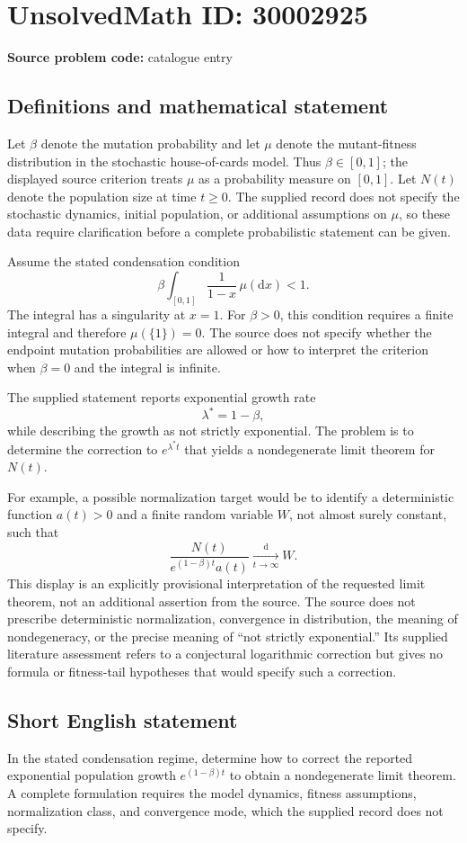 \documentclass[11pt]{article}
\begin{document}
\section*{UnsolvedMath ID: 30002925}
\textbf{Source problem code:} catalogue entry
\subsection{Definitions and mathematical statement}
Let \(\beta\) denote the mutation probability and let \(\mu\) denote the mutant-fitness distribution in the stochastic house-of-cards model. Thus \(\beta\in[0,1]\); the displayed source criterion treats \(\mu\) as a probability measure on \([0,1]\). Let \(N(t)\) denote the population size at time \(t\geq0\). The supplied record does not specify the stochastic dynamics, initial population, or additional assumptions on \(\mu\), so these data require clarification before a complete probabilistic statement can be given.

Assume the stated condensation condition
\[
\beta\int_{[0,1]}\frac{1}{1-x}\,\mu(\mathrm{d}x)<1.
\]
The integral has a singularity at \(x=1\). For \(\beta>0\), this condition requires a finite integral and therefore \(\mu(\{1\})=0\). The source does not specify whether the endpoint mutation probabilities are allowed or how to interpret the criterion when \(\beta=0\) and the integral is infinite.

The supplied statement reports exponential growth rate
\[
\lambda^*=1-\beta,
\]
while describing the growth as not strictly exponential. The problem is to determine the correction to \(e^{\lambda^*t}\) that yields a nondegenerate limit theorem for \(N(t)\).

For example, a possible normalization target would be to identify a deterministic function \(a(t)>0\) and a finite random variable \(W\), not almost surely constant, such that
\[
\frac{N(t)}{e^{(1-\beta)t}a(t)}
\xrightarrow[t\to\infty]{\mathrm{d}} W.
\]
This display is an explicitly provisional interpretation of the requested limit theorem, not an additional assertion from the source. The source does not prescribe deterministic normalization, convergence in distribution, the meaning of nondegeneracy, or the precise meaning of ``not strictly exponential.'' Its supplied literature assessment refers to a conjectural logarithmic correction but gives no formula or fitness-tail hypotheses that would specify such a correction.
\subsection{Short English statement}
In the stated condensation regime, determine how to correct the reported exponential population growth \(e^{(1-\beta)t}\) to obtain a nondegenerate limit theorem. A complete formulation requires the model dynamics, fitness assumptions, normalization class, and convergence mode, which the supplied record does not specify.
\end{document}
